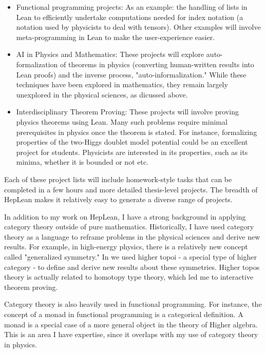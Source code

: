 \documentclass[12pt,letter]{article}
\newcounter{customtitle}
\begin{document}
\begin{itemize}
	\item Functional programming projects: As an example: the handling of lists in Lean to efficiently undertake computations needed for index notation (a notation used by physicists to deal with tensors). Other examples will involve meta-programming in Lean to make the user-experience easier.
\item AI in Physics and Mathematics: These projects will explore auto-formalization of theorems in physics (converting human-written results into Lean proofs) and the inverse process, "auto-informalization." While these techniques have been explored in mathematics, they remain largely unexplored in the physical sciences, as dicussed above.
\item Interdisciplinary Theorem Proving: These projects will involve proving physics theorems using Lean. Many such problems require minimal prerequisites in physics once the theorem is stated. For instance, formalizing properties of the two-Higgs doublet model potential could be an excellent project for students. Physicists are interested in its properties, 
such as its minima, whether it is bounded or not etc.
\end{itemize}
Each of these project lists will include homework-style tasks that can be completed in a few hours and more detailed thesis-level projects. The breadth of HepLean makes it relatively easy to generate a diverse range of projects.


In addition to my work on HepLean, I have a strong background in applying category theory outside of pure mathematics. Historically, I have used category theory as a language to reframe problems in the physical sciences and derive new results. For example, in high-energy physics, there is a relatively new concept called "generalized symmetry." In \js{} we used higher topoi - a special type of higher category - to define and derive new results about these symmetries. Higher topos theory is actually related to homotopy type theory, which led me to interactive theorem proving.

Category theory is also heavily used in functional programming. For instance, the concept of a monad in functional programming is a categorical definition. A monad is a special case of a more general object in the theory of Higher algebra. 
This is an area I have expertise, since it overlaps with my use of category theory in physics. 
\end{document}
